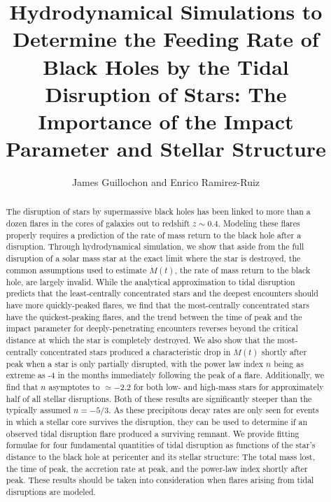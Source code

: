 \documentclass[twocolumn]{emulateapj}
\newcommand{\md}{\dot{M}\left(t\right)}
\begin{document}

\title{Hydrodynamical Simulations to Determine the Feeding Rate of Black Holes by the Tidal Disruption of Stars: The Importance of the Impact Parameter and Stellar Structure}

\author{James Guillochon and Enrico Ramirez-Ruiz }
   
\begin{abstract} 
The disruption of stars by supermassive black holes has been linked to more than a dozen flares in the cores of galaxies out to redshift $z \sim 0.4$. Modeling these flares properly requires a prediction of the rate of mass return to the black hole after a disruption. Through hydrodynamical simulation, we show that aside from the full disruption of a solar mass star at the exact limit where the star is destroyed, the common assumptions used to estimate $\md$, the rate of mass return to the black hole, are largely invalid. While the analytical approximation to tidal disruption predicts that the least-centrally concentrated stars and the deepest encounters should have more quickly-peaked flares, we find that the most-centrally concentrated stars have the quickest-peaking flares, and the trend between the time of peak and the impact parameter for deeply-penetrating encounters reverses beyond the critical distance at which the star is completely destroyed. We also show that the most-centrally concentrated stars produced a characteristic drop in $\md$ shortly after peak when a star is only partially disrupted, with the power law index $n$ being as extreme as -4 in the months immediately following the peak of a flare. Additionally, we find that $n$ asymptotes to $\simeq -2.2$ for both low- and high-mass stars for approximately half of all stellar disruptions. Both of these results are significantly steeper than the typically assumed $n = -5/3$. As these precipitous decay rates are only seen for events in which a stellar core survives the disruption, they can be used to determine if an observed tidal disruption flare produced a surviving remnant. We provide fitting formulae for four fundamental quantities of tidal disruption as functions of the star's distance to the black hole at pericenter and its stellar structure: The total mass lost, the time of peak, the accretion rate at peak, and the power-law index shortly after peak. These results should be taken into consideration when flares arising from tidal disruptions are modeled.
\end{abstract}
\end{document}
